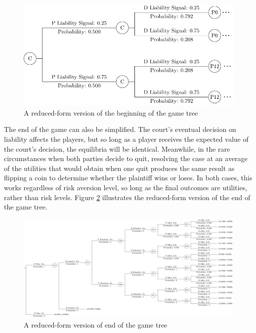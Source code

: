 \documentclass{article}
\begin{document}
\begin{figure}[h!]
\centering
\includegraphics[scale=0.25, trim={0in 0in 0in 0in}, clip]{../Figures/game tree 2x2x2 beginning simplified.pdf}
\caption{A reduced-form version of the beginning of the game tree}
\label{fig:gametree2x2x2beginning_reduced}
\end{figure}

The end of the game can also be simplified. The court's eventual decision on liability affects the players, but so long as a player receives the expected value of the court's decision, the equilibria will be identical. Meanwhile, in the rare circumstances when both parties decide to quit, resolving the case at an average of the utilities that would obtain when one quit produces the same result as flipping a coin to determine whether the plaintiff wins or loses. In both cases, this works regardless of risk aversion level, so long as the final outcomes are utilities, rather than risk levels. Figure \ref{fig:gametree2x2x2end_reduced} illustrates the reduced-form version of the end of the game tree. 

\begin{figure}[h!]
\centering
\includegraphics[scale=0.25, trim={0in 0in 0in 0in}, clip]{../Figures/game tree 2x2x2 end simplified.pdf}
\caption{A reduced-form version of end of the game tree}
\label{fig:gametree2x2x2end_reduced}
\end{figure}
\end{document}
